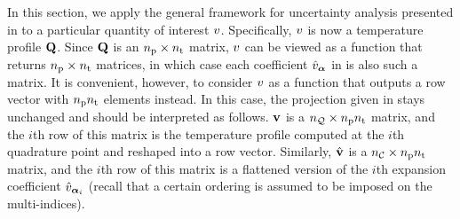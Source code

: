 In this section, we apply the general framework for uncertainty analysis presented in  to a particular quantity of interest $v$.
Specifically, $v$ is now a temperature profile $\mathbf{Q}$.
Since $\mathbf{Q}$ is an ${n_\text{p}} \times {n_\text{t}}$ matrix, $v$ can be viewed as a function that returns ${n_\text{p}} \times {n_\text{t}}$ matrices, in which case each coefficient $\hat{v}_{\bm{\alpha}}$ in  is also such a matrix.
It is convenient, however, to consider $v$ as a function that outputs a row vector with ${n_\text{p}} {n_\text{t}}$ elements instead.
In this case, the projection given in  stays unchanged and should be interpreted as follows.
$\mathbf{v}$ is a ${n_\mathcal{Q}} \times {n_\text{p}} {n_\text{t}}$ matrix, and the $i$th row of this matrix is the temperature profile computed at the $i$th quadrature point and reshaped into a row vector.
Similarly, $\hat{\mathbf{v}}$ is a ${n_\mathcal{C}} \times {n_\text{p}} {n_\text{t}}$ matrix, and the $i$th row of this matrix is a flattened version of the $i$th expansion coefficient $\hat{v}_{\bm{\alpha}_i}$ (recall that a certain ordering is assumed to be imposed on the multi-indices).
